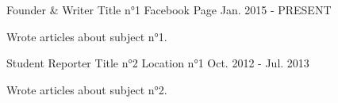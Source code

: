 


\begin{cventries}


\cventry
{Founder \& Writer} %
{Title n°1} %
{Facebook Page} %
{Jan. 2015 - PRESENT} %
{ %
\begin{cvitems}
\item {Wrote articles about subject n°1.}
\end{cvitems}
}


\cventry
{Student Reporter} %
{Title n°2} %
{Location n°1} %
{Oct. 2012 - Jul. 2013} %
{ %
\begin{cvitems}
\item {Wrote articles about subject n°2.}
\end{cvitems}
}


\end{cventries}